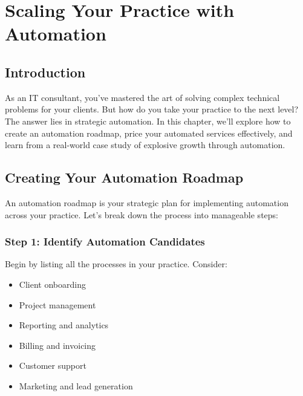 \chapter{Scaling Your Practice with Automation}


\section{Introduction}

As an IT consultant, you've mastered the art of solving complex technical problems for your clients. But how do you take your practice to the next level? The answer lies in strategic automation. In this chapter, we'll explore how to create an automation roadmap, price your automated services effectively, and learn from a real-world case study of explosive growth through automation.


\section{Creating Your Automation Roadmap}

An automation roadmap is your strategic plan for implementing automation across your practice. Let's break down the process into manageable steps:

\subsection{Step 1: Identify Automation Candidates}

Begin by listing all the processes in your practice. Consider:
\begin{itemize}
    \item Client onboarding
    \item Project management
    \item Reporting and analytics
    \item Billing and invoicing
    \item Customer support
    \item Marketing and lead generation
\end{itemize}

